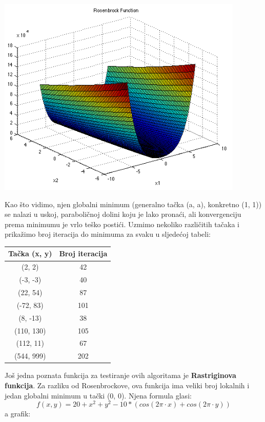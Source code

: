 \documentclass[bosnian,12pt,a4paper]{report}
\begin{document}
\begin{center}
   \includegraphics[scale=0.8]{rosenbrockfunction.png}
\end{center}

Kao što vidimo, njen globalni minimum (generalno tačka (a, a), konkretno (1, 1)) se nalazi u uskoj, paraboličnoj dolini koju je lako pronaći, ali konvergenciju prema minimumu je vrlo teško postići. Uzmimo nekoliko različitih tačaka i prikažimo broj iteracija do minimuma za svaku u sljedećoj tabeli:\\
\begin{center}
\begin{tabular}{|c|c|}
\hline
Tačka (x, y) & Broj iteracija \\ \hline
(2, 2)       & 42             \\ \hline
(-3, -3)     & 40             \\ \hline
(22, 54)     & 87             \\ \hline
(-72, 83)    & 101            \\ \hline
(8, -13)     & 38             \\ \hline
(110, 130)   & 105            \\ \hline
(112, 11)    & 67             \\ \hline
(544, 999)   & 202            \\ \hline
\end{tabular}
\end{center}


Još jedna poznata funkcija za testiranje ovih algoritama je \textbf{Rastriginova funkcija}. Za razliku od Rosenbrockove, ova funkcija ima veliki broj lokalnih i jedan globalni minimum u tački (0, 0). Njena formula glasi:
$$ f(x, y) = 20 + x^2 + y^2 -10*(cos(2\pi\cdot x) + cos(2\pi\cdot y)) $$
a grafik:\\
\end{document}
